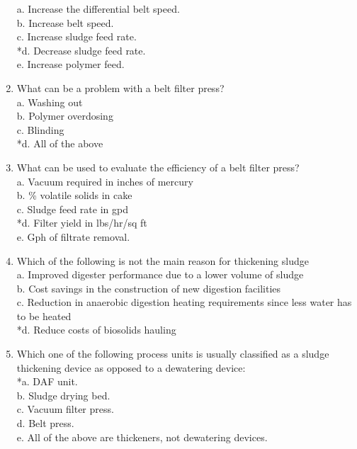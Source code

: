 \documentclass{article}
\begin{document}
\begin{enumerate}
a. Increase the differential belt speed. \\
b. Increase belt speed. \\
c. Increase sludge feed rate. \\
*d. Decrease sludge feed rate. \\
e. Increase polymer feed. \\

\item  What can be a problem with a belt filter press? \\

a. Washing out \\
b. Polymer overdosing \\
c. Blinding \\
*d. All of the above \\

\item  What can be used to evaluate the efficiency of a belt filter press? \\

a. Vacuum required in inches of mercury \\
b. \% volatile solids in cake \\
c. Sludge feed rate in gpd \\
*d. Filter yield in lbs/hr/sq ft \\
e. Gph of filtrate removal. \\

\item  Which of the following is not the main reason for thickening sludge \\

a. Improved digester performance due to a lower volume of sludge \\
b. Cost savings in the construction of new digestion facilities \\
c. Reduction in anaerobic digestion heating requirements since less water has to be heated \\
*d. Reduce costs of biosolids hauling \\

\item  Which one of the following process units is usually classified as a sludge thickening device as opposed to a dewatering device: \\

*a. DAF unit. \\
b. Sludge drying bed. \\
c. Vacuum filter press. \\
d. Belt press. \\
e. All of the above are thickeners, not dewatering devices. \\


\end{enumerate}
\end{document}
